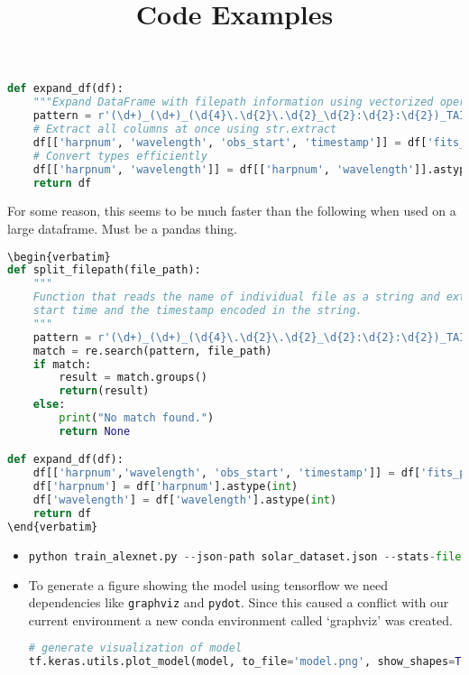 \documentclass{../template/texnote}
\title{Code Examples}
\begin{document}
    \maketitle {}

\begin{lstlisting}[language=Python]
def expand_df(df):
    """Expand DataFrame with filepath information using vectorized operations."""
    pattern = r'(\d+)_(\d+)_(\d{4}\.\d{2}\.\d{2}_\d{2}:\d{2}:\d{2})_TAI_(\d{4}-\d{2}-\d{2}T\d{2}:\d{2}:\d{2}Z)'
    # Extract all columns at once using str.extract
    df[['harpnum', 'wavelength', 'obs_start', 'timestamp']] = df['fits_path'].str.extract(pattern)
    # Convert types efficiently
    df[['harpnum', 'wavelength']] = df[['harpnum', 'wavelength']].astype(int)
    return df
\end{lstlisting}
For some reason, this seems to be much faster than the following when used on a large dataframe.
Must be a pandas thing.

\begin{lstlisting}[language=Python]
\begin{verbatim}
def split_filepath(file_path):
    """ 
    Function that reads the name of individual file as a string and extracts AARP id, wavelength, observation
    start time and the timestamp encoded in the string.
    """
    pattern = r'(\d+)_(\d+)_(\d{4}\.\d{2}\.\d{2}_\d{2}:\d{2}:\d{2})_TAI_(\d{4}-\d{2}-\d{2}T\d{2}:\d{2}:\d{2}Z)'
    match = re.search(pattern, file_path)
    if match:
        result = match.groups()
        return(result)
    else:
        print("No match found.")
        return None

def expand_df(df):
    df[['harpnum','wavelength', 'obs_start', 'timestamp']] = df['fits_path'].apply(split_filepath).apply(pd.Series)
    df['harpnum'] = df['harpnum'].astype(int)
    df['wavelength'] = df['wavelength'].astype(int)
    return df
\end{verbatim}
\end{lstlisting}


	\begin{itemize}
		\item 
\begin{lstlisting}[language=Python]
python train_alexnet.py --json-path solar_dataset.json --stats-file /data/linn/stats.pkl
\end{lstlisting}

\item
To generate a figure showing the model using tensorflow we need dependencies like \texttt{graphviz} and \texttt{pydot}.
Since this caused a conflict with our current environment a new conda environment called `graphviz' was created.
\begin{lstlisting}[language=Python]
# generate visualization of model
tf.keras.utils.plot_model(model, to_file='model.png', show_shapes=True, show_layer_names=True)
\end{lstlisting}
	\end{itemize}



    \printbibliography
\end{document}
